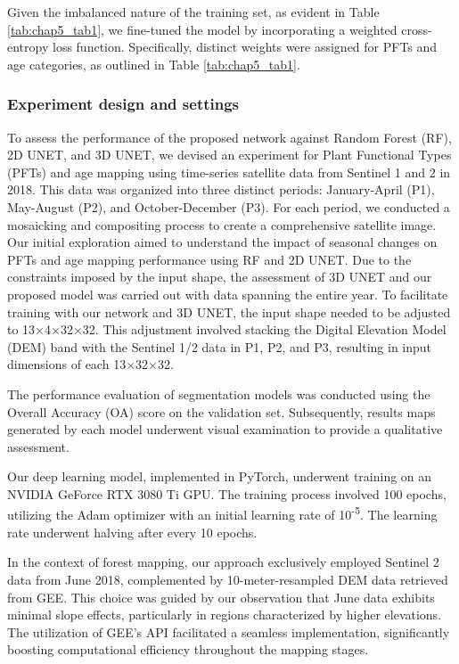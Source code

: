 Given the imbalanced nature of the training set, as evident in Table \ref{tab:chap5_tab1}, we fine-tuned the model by incorporating a weighted cross-entropy loss function. Specifically, distinct weights were assigned for PFTs and age categories, as outlined in Table \ref{tab:chap5_tab1}.

\subsubsection*{Experiment design and settings}
To assess the performance of the proposed network against Random Forest (RF), 2D UNET, and 3D UNET, we devised an experiment for Plant Functional Types (PFTs) and age mapping using time-series satellite data from Sentinel 1 and 2 in 2018. This data was organized into three distinct periods: January-April (P1), May-August (P2), and October-December (P3). For each period, we conducted a mosaicking and compositing process to create a comprehensive satellite image. Our initial exploration aimed to understand the impact of seasonal changes on PFTs and age mapping performance using RF and 2D UNET. Due to the constraints imposed by the input shape, the assessment of 3D UNET and our proposed model was carried out with data spanning the entire year. To facilitate training with our network and 3D UNET, the input shape needed to be adjusted to 13$\times$4$\times$32$\times$32. This adjustment involved stacking the Digital Elevation Model (DEM) band with the Sentinel 1/2 data in P1, P2, and P3, resulting in input dimensions of each 13$\times$32$\times$32. \par

The performance evaluation of segmentation models was conducted using the Overall Accuracy (OA) score on the validation set. Subsequently, results maps generated by each model underwent visual examination to provide a qualitative assessment.\par

Our deep learning model, implemented in PyTorch, underwent training on an NVIDIA GeForce RTX 3080 Ti GPU. The training process involved 100 epochs, utilizing the Adam optimizer \citep{kingma2014adam} with an initial learning rate of 10\textsuperscript{-5}. The learning rate underwent halving after every 10 epochs.\par

In the context of forest mapping, our approach exclusively employed Sentinel 2 data from June 2018, complemented by 10-meter-resampled DEM data retrieved from GEE. This choice was guided by our observation that June data exhibits minimal slope effects, particularly in regions characterized by higher elevations. The utilization of GEE's API facilitated a seamless implementation, significantly boosting computational efficiency throughout the mapping stages. \par

